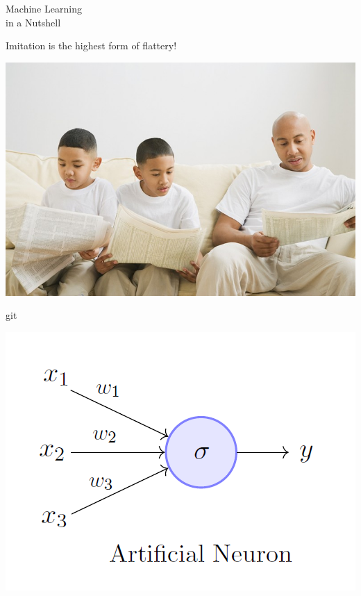 \documentclass[aspectratio=169,x11names]{beamer}
\begin{document}
\begin{frame}
\begin{center}
\huge
Machine Learning\\ in a Nutshell
\end{center}
\end{frame}

\begin{frame}
\begin{center}
\Large Imitation is the highest form of flattery!
\medskip\medskip

\includegraphics[scale=0.35]{images/imitation}
\end{center}
\end{frame}

\begin{frame}git
\begin{center}
\includegraphics[width=.75\textwidth]{images/perceptron} 
\end{center}
\end{frame}
\end{document}
